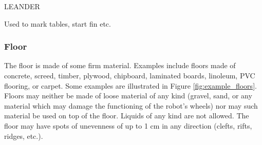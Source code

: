 LEANDER

Used to mark tables, start fin etc.

\subsubsection{Floor}
The floor is made of some firm material. Examples include floors made of concrete, screed, timber, plywood, chipboard, laminated boards, linoleum, PVC flooring, or carpet. Some examples are illustrated in Figure \ref{fig:example_floors}. Floors may neither be made of loose material of any kind (gravel, sand, or any material which may damage the functioning of the robot's wheels) nor may such material be used on top of the floor. Liquids of any kind are not allowed. The floor may have spots of unevenness of up to 1 cm in any direction (clefts, rifts, ridges, etc.).

